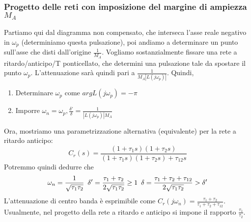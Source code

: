 \documentclass[11pt]{article}
\begin{document}
\subsubsection{Progetto delle reti con imposizione del margine di ampiezza $M_A$}
Partiamo qui dal diagramma non compensato, che interseca l'asse reale negativo in $\omega_p$ (determiniamo questa pulsazione), poi andiamo a determinare un punto sull'asse che disti dall'origine $\frac{1}{M_A}$. Vogliamo sostanzialmente fissare una rete a ritardo/anticipo/T ponticellato, che determini una pulsazione tale da spostare il punto $\omega_p$. L'attenuazione sarà quindi pari a $\frac{1}{M_A|L(j\omega_p)|}$.
Quindi,
\begin{enumerate}
    \item Determinare $\omega_p$ come $argL(j\omega_p)=-\pi$
    \item Imporre $\omega_n=\omega_p, \frac{\delta'}{\delta}=\frac{1}{|L(j\omega_p)| M_A}$
\end{enumerate}
Ora, mostriamo una parametrizzazione alternativa (equivalente) per la rete a ritardo anticipo:
\begin{displaymath}
    C_r(s)=\frac{(1+\tau_1 s)(1+\tau_2s)}{(1+\tau_1 s)(1+\tau_2s)+\tau_{12}s}
\end{displaymath}
Potremmo quindi dedurre che
\begin{displaymath}
    \omega_n=\frac{1}{\sqrt{\tau_1\tau_2}}\hspace{5px}\delta'=\frac{\tau_1+\tau_2}{2\sqrt{\tau_1\tau_2}}\ge1\hspace{5px}\delta=\frac{\tau_1+\tau_2+\tau_{12}}{2\sqrt{\tau_1\tau_2}}>\delta'
\end{displaymath}
L'attenuazione di centro banda è esprimibile come $C_r(j\omega_n)=\frac{\tau_1+\tau_2}{\tau_1+\tau_2+\tau_{12}}$. Usualmente, nel progetto della rete a ritardo e anticipo si impone il rapporto $\frac{\tau_1}{\tau_2}$.
\end{document}
